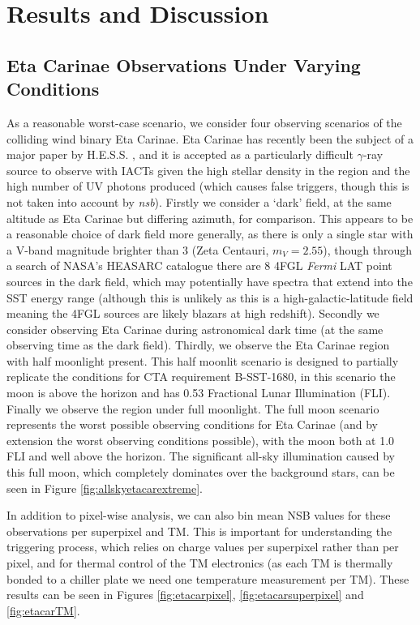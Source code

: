 \section{Results and Discussion}
\subsection{Eta Carinae Observations Under Varying Conditions}
\label{sec:etacarvary}
As a reasonable worst-case scenario, we consider four observing scenarios of the colliding wind binary Eta Carinae. Eta Carinae has recently been the subject of a major paper by H.E.S.S. \cite{hessetacar}, and it is accepted as a particularly difficult $\gamma$-ray source to observe with IACTs given the high stellar density in the region and the high number of UV photons produced (which causes false triggers, though this is not taken into account by \textit{nsb}). Firstly we consider a `dark' field, at the same altitude as Eta Carinae but differing azimuth, for comparison. This appears to be a reasonable choice of dark field more generally, as there is only a single star with a V-band magnitude brighter than 3 (Zeta Centauri, $m_V=2.55$), though through a search of NASA's HEASARC catalogue there are 8 4FGL \textit{Fermi} LAT point sources in the dark field, which may potentially have spectra that extend into the SST energy range (although this is unlikely as this is a high-galactic-latitude field meaning the 4FGL sources are likely blazars at high redshift). Secondly we consider observing Eta Carinae during astronomical dark time (at the same observing time as the dark field). Thirdly, we observe the Eta Carinae region with half moonlight present. This half moonlit scenario is designed to partially replicate the conditions for CTA requirement B-SST-1680, in this scenario the moon is above the horizon and has 0.53 Fractional Lunar Illumination (FLI). Finally we observe the region under full moonlight. The full moon scenario represents the worst possible observing conditions for Eta Carinae (and by extension the worst observing conditions possible), with the moon both at 1.0 FLI and well above the horizon. The significant all-sky illumination caused by this full moon, which completely dominates over the background stars, can be seen in Figure \ref{fig:allskyetacarextreme}.

In addition to pixel-wise analysis, we can also bin mean NSB values for these observations per superpixel and TM. This is important for understanding the triggering process, which relies on charge values per superpixel rather than per pixel, and for thermal control of the TM electronics (as each TM is thermally bonded to a chiller plate we need one temperature measurement per TM). These results can be seen in Figures \ref{fig:etacarpixel}, \ref{fig:etacarsuperpixel} and \ref{fig:etacarTM}.

